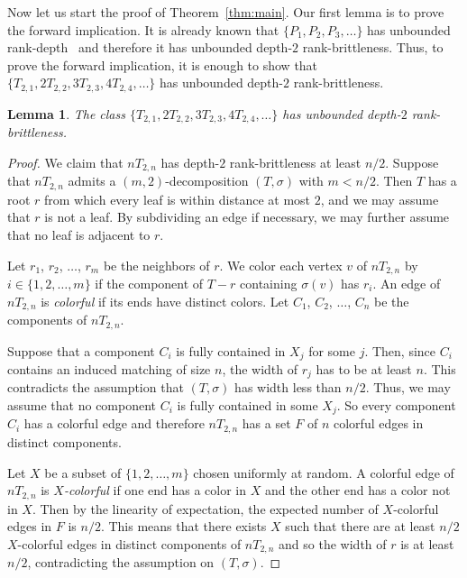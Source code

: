 \documentclass[11pt]{article}
\newtheorem{lemma}[theorem]{Lemma}
\begin{document}
      Now let us start the proof of Theorem~\ref{thm:main}.
      Our first lemma is to prove the forward implication.
      It is already known that $\{P_1, P_2, P_3, \ldots \}$ has unbounded rank-depth~\cite{DKO2019} and therefore it has unbounded depth-$2$
      rank-brittleness.
      Thus, to prove the forward implication,
      it is enough to show that  $\{T_{2,1}, 2T_{2,2}, 3T_{2,3}, 4T_{2,4}, \ldots \}$
      has unbounded depth-$2$ rank-brittleness.
	\begin{lemma}
	The class $\{T_{2,1}, 2T_{2,2}, 3T_{2,3}, 4T_{2,4}, \ldots \}$ has unbounded depth-$2$ rank-brittleness.
	\end{lemma}
	\begin{proof}
	We claim that $nT_{2,n}$ has depth-$2$ rank-brittleness at least $n/2$.
	Suppose that $nT_{2,n}$ admits a $(m,2)$-decomposition $(T, \sigma)$ with $m<n/2$.
        Then $T$ has a root $r$ from which every leaf is within distance at most $2$, and we may assume that $r$ is not a leaf.
	By subdividing an edge if necessary,
	we may further assume that no leaf is adjacent to $r$.
	
	Let $r_1$, $r_2$, $\ldots$, $r_m$ be the neighbors of $r$.
        We color each vertex $v$ of $nT_{2,n}$ by $i\in\{1,2,\ldots,m\}$
        if the component of $T-r$ containing $\sigma(v)$
        has $r_i$.
        An edge of $nT_{2,n}$ is \emph{colorful} if its ends have distinct colors.
	Let $C_1$, $C_2$, $\ldots$, $C_n$ be the components of $nT_{2,n}$.
	
	Suppose that a component $C_i$ is fully contained in $X_j$ for some $j$.
	Then, since $C_i$ contains an induced matching of size $n$, 
	the width of $r_j$ has to be at least $n$.
	This contradicts the assumption that $(T, \sigma)$ has width less than $n/2$. 
	Thus, we may assume that no component $C_i$ is fully contained in some $X_j$.
        So every component $C_i$ has a colorful edge
        and therefore $nT_{2,n}$ has a set $F$ of
        $n$ colorful edges in distinct components.

        Let $X$ be a subset of $\{1,2,\ldots,m\}$ chosen uniformly at random.
        A colorful edge of $nT_{2,n}$ is \emph{$X$-colorful} if
        one end has a color in $X$ and the other end has a color not in $X$.
        Then by the linearity of expectation,
        the expected number of $X$-colorful edges in $F$
        is $n/2$.
        This means that
        there exists $X$ such that there are at least $n/2$ $X$-colorful edges in distinct components of $nT_{2,n}$ and so 
        the width of $r$ is at least $n/2$, contradicting the assumption on $(T,\sigma)$.
      \end{proof}
	
\end{document}
